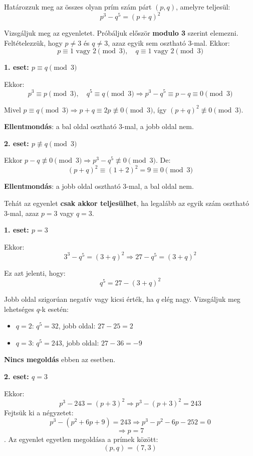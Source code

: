 \begin{problem}
	Határozzuk meg az összes olyan prím szám párt $(p,q)$,
	amelyre teljesül: 
	\[
	p^{3}-q^{5}=(p+q)^{2}
	\]
\end{problem}
\begin{solution}
	Vizsgáljuk meg az egyenletet. 
	Próbáljuk először \textbf{modulo 3} szerint elemezni. Feltételezzük,
	hogy $p\ne3$ és $q\ne3$, azaz egyik sem osztható 3-mal. Ekkor: 
	\[
	p\equiv1\text{ vagy }2\pmod 3,\quad q\equiv1\text{ vagy }2\pmod 3
	\]
	
	\textbf{1. eset: $p\equiv q\pmod 3$}
	
	Ekkor: 
	\[
	p^{3}\equiv p\pmod 3,\quad q^{5}\equiv q\pmod 3\Rightarrow p^{3}-q^{5}\equiv p-q\equiv0\pmod 3
	\]
	
	Mivel $p\equiv q\pmod 3\Rightarrow p+q\equiv2p\not\equiv0\pmod 3$,
	így $(p+q)^{2}\not\equiv0\pmod 3$.
	
	\textbf{Ellentmondás}: a bal oldal osztható 3-mal, a jobb oldal nem. 
	
	\textbf{2. eset: $p\not\equiv q\pmod 3$}
	
	Ekkor $p-q\not\equiv0\pmod 3\Rightarrow p^{3}-q^{5}\not\equiv0\pmod 3$.
	De: 
	\[
	(p+q)^{2}\equiv(1+2)^{2}=9\equiv0\pmod 3
	\]
	
	\textbf{Ellentmondás}: a jobb oldal osztható 3-mal, a bal oldal nem. 
	
	Tehát az egyenlet \textbf{csak akkor teljesülhet}, ha legalább az
	egyik szám osztható 3-mal, azaz $p=3$ vagy $q=3$. 
	
	\textbf{1. eset: $p=3$} 
	
	Ekkor: 
	\[
	3^{3}-q^{5}=(3+q)^{2}\Rightarrow27-q^{5}=(3+q)^{2}
	\]
	
	Ez azt jelenti, hogy: 
	\[
	q^{5}=27-(3+q)^{2}
	\]
	
	Jobb oldal szigorúan negatív vagy kicsi érték, ha $q$ elég nagy.
	Vizsgáljuk meg lehetséges $q$-k esetén: 
	\begin{itemize}
		\item $q=2$: $q^{5}=32$, jobb oldal: $27-25=2$ 
		\item $q=3$: $q^{5}=243$, jobb oldal: $27-36=-9$ 
	\end{itemize}
	\textbf{Nincs megoldás} ebben az esetben. 
	
	\textbf{2. eset: $q=3$} 
	
	Ekkor: 
	\[
	p^{3}-243=(p+3)^{2}\Rightarrow p^{3}-(p+3)^{2}=243
	\]
	Fejtsük ki a négyzetet: 
	\[
	p^{3}-(p^{2}+6p+9)=243\Rightarrow p^{3}-p^{2}-6p-252=0
	\]
	\[
	\Rightarrow p=7
	\]
	. 
	Az egyenlet egyetlen megoldása a prímek között: 
	\[
	(p,q)=(7,3)
	\]
\end{solution}

